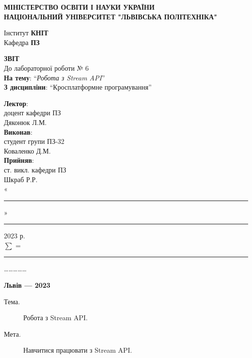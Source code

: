 \documentclass[14pt]{extreport}
\newcommand\subject{Кросплатформне програмування}
\newcommand\lecturer{доцент кафедри ПЗ\\Дяконюк Л.М.}
\newcommand\teacher{ст. викл. кафедри ПЗ\\Шкраб Р.Р.}
\newcommand\mygroup{ПЗ-32}
\newcommand\lab{6}
\newcommand\theme{Робота з Stream API}
\newcommand\purpose{Навчитися працювати з Stream API}
\begin{document}
\begin{normalsize}
	\begin{titlepage}
		\thispagestyle{empty}
		\begin{center}
			\textbf{МІНІСТЕРСТВО ОСВІТИ І НАУКИ УКРАЇНИ\\
				НАЦІОНАЛЬНИЙ УНІВЕРСИТЕТ "ЛЬВІВСЬКА ПОЛІТЕХНІКА"}
		\end{center}
		\begin{flushright}
			Інститут \textbf{КНІТ}\\
			Кафедра \textbf{ПЗ}
		\end{flushright}
		\vspace{160pt}
		\begin{center}
			\textbf{ЗВІТ}\\
			\vspace{10pt}
			До лабораторної роботи № \lab\\
			\textbf{На тему}: “\textit{\theme}”\\
			\textbf{З дисципліни}: “\subject”
		\end{center}
		\vspace{40pt}
		\begin{flushright}
			
			\textbf{Лектор}:\\
			\lecturer\\
			\vspace{10pt}
			\textbf{Виконав}:\\
			
			студент групи \mygroup\\
			Коваленко Д.М.\\
			\vspace{10pt}
			\textbf{Прийняв}:\\
			
			\teacher\\
			
			\vspace{28pt}
			«\rule{1cm}{0.15mm}» \rule{1.5cm}{0.15mm} 2023 р.\\
			$\sum$ = \rule{1cm}{0.15mm}……………\\
			
		\end{flushright}
		\vspace{\fill}
		\begin{center}
			\textbf{Львів — 2023}
		\end{center}
	\end{titlepage}
		
	\begin{description}
		\item[Тема.] \theme.
		\item[Мета.] \purpose.
	\end{description}
	


\end{normalsize}
\end{document}
